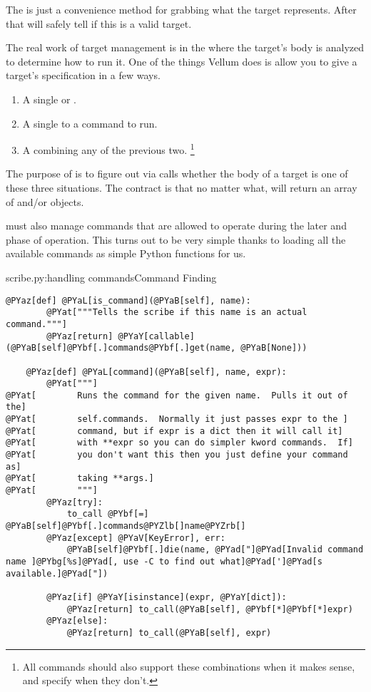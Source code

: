 The  is just a convenience method for grabbing what the
target represents.  After that  will safely tell 
if this is a valid target.

The real work of target management is in the  where the
target's body is analyzed to determine how to run it.   One of the things Vellum
does is allow you to give a target's specification in a few ways.

\begin{enumerate}
\item A single  or .
\item A single  to a command to run.
\item A  combining any of the previous two.
    \footnote{All commands should also support these combinations when it makes
        sense, and specify when they don't.}
\end{enumerate}

The purpose of  is to figure out via 
calls whether the body of a target is one of these three situations.  The
contract is that no matter what,  will return an array of
 and/or  objects.

 must also manage commands that are allowed to operate during the
later  and  phase of operation.  This turns out
to be very simple thanks to  loading all the available commands as
simple Python functions for us.

\begin{code}{scribe.py:handling commands}{Command Finding}
\begin{Verbatim}[commandchars=@\[\]]
    @PYaz[def] @PYaL[is_command](@PYaB[self], name):
        @PYat["""Tells the scribe if this name is an actual command."""]
        @PYaz[return] @PYaY[callable](@PYaB[self]@PYbf[.]commands@PYbf[.]get(name, @PYaB[None]))

    @PYaz[def] @PYaL[command](@PYaB[self], name, expr):
        @PYat["""]
@PYat[        Runs the command for the given name.  Pulls it out of the]
@PYat[        self.commands.  Normally it just passes expr to the ]
@PYat[        command, but if expr is a dict then it will call it]
@PYat[        with **expr so you can do simpler kword commands.  If]
@PYat[        you don't want this then you just define your command as]
@PYat[        taking **args.]
@PYat[        """]
        @PYaz[try]:
            to_call @PYbf[=] @PYaB[self]@PYbf[.]commands@PYZlb[]name@PYZrb[]
        @PYaz[except] @PYaV[KeyError], err:
            @PYaB[self]@PYbf[.]die(name, @PYad["]@PYad[Invalid command name ]@PYbg[%s]@PYad[, use -C to find out what]@PYad[']@PYad[s available.]@PYad["])

        @PYaz[if] @PYaY[isinstance](expr, @PYaY[dict]):
            @PYaz[return] to_call(@PYaB[self], @PYbf[*]@PYbf[*]expr)
        @PYaz[else]:
            @PYaz[return] to_call(@PYaB[self], expr)
\end{Verbatim}

\end{code}

